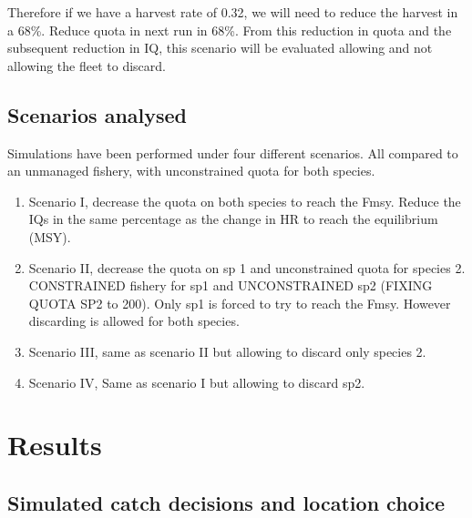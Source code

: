 \documentclass[12pt,oneline,a4paper,numbib]{ouparticle}
\begin{document}
Therefore if we have a harvest rate of 0.32, we will need to reduce the harvest in a 68\%. Reduce quota in next run in 68\%. From this reduction in quota and the subsequent reduction in IQ, this scenario will be evaluated allowing and not allowing the fleet to discard. 

\subsection{Scenarios analysed}
\label{sec2.4}

Simulations have been performed under four different scenarios. All compared to an unmanaged fishery,  with unconstrained quota for both species.

\begin{enumerate}

\item
Scenario I,  decrease the quota on both species to reach the Fmsy.
Reduce the IQs in the same percentage as the change in HR to reach the equilibrium (MSY). 

\item 
Scenario II, decrease the quota on sp 1 and unconstrained quota for species 2.
CONSTRAINED fishery for sp1 and UNCONSTRAINED sp2 (FIXING QUOTA SP2 to 200). Only sp1 is forced to try to reach the Fmsy. However discarding is allowed for both species.

\item
Scenario III, same as scenario II but allowing to discard only species 2.

\item
Scenario IV, Same as scenario I but allowing to discard sp2.
\end{enumerate}


\section{Results}
\label{sec3}


\subsection{Simulated catch decisions and location choice}
\label{sec3.1}
\end{document}
